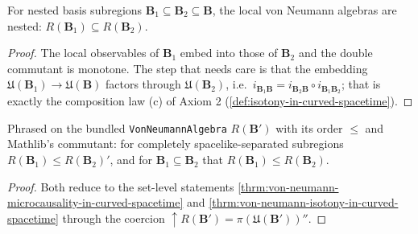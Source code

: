 \begin{theorem}
    \label{thrm:von-neumann-isotony-in-curved-spacetime}
    \leanok
    For nested basis subregions $\mathbf{B}_1 \subseteq \mathbf{B}_2 \subseteq \mathbf{B}$, the local von Neumann algebras are nested: $R(\mathbf{B}_1) \subseteq R(\mathbf{B}_2)$.
\end{theorem}
\begin{proof}
    \leanok
    The local observables of $\mathbf{B}_1$ embed into those of $\mathbf{B}_2$ and the double commutant is monotone. The step that needs care is that the embedding $\mathfrak{U}(\mathbf{B}_1) \to \mathfrak{U}(\mathbf{B})$ factors through $\mathfrak{U}(\mathbf{B}_2)$, i.e.\ $i_{\mathbf{B}_1\mathbf{B}} = i_{\mathbf{B}_2\mathbf{B}} \circ i_{\mathbf{B}_1\mathbf{B}_2}$; that is exactly the composition law (c) of Axiom 2 (\ref{def:isotony-in-curved-spacetime}).
\end{proof}

\begin{theorem}
    \label{thrm:von-neumann-bundled-order-in-curved-spacetime}
    \leanok
    Phrased on the bundled \texttt{VonNeumannAlgebra} $R(\mathbf{B}')$ with its order $\le$ and Mathlib's commutant: for completely spacelike-separated subregions $R(\mathbf{B}_1) \le R(\mathbf{B}_2)'$, and for $\mathbf{B}_1 \subseteq \mathbf{B}_2$ that $R(\mathbf{B}_1) \le R(\mathbf{B}_2)$.
\end{theorem}
\begin{proof}
    \leanok
    Both reduce to the set-level statements \ref{thrm:von-neumann-microcausality-in-curved-spacetime} and \ref{thrm:von-neumann-isotony-in-curved-spacetime} through the coercion $\uparrow R(\mathbf{B}') = \pi(\mathfrak{U}(\mathbf{B}'))''$.
\end{proof}

